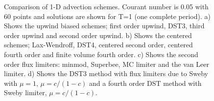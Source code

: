 \begin{figure}
\caption{
Comparison of 1-D advection schemes. Courant number is 0.05 with 60
points and solutions are shown for T=1 (one complete period).
a) Shows the upwind biased schemes; first order upwind, DST3,
third order upwind and second order upwind.
b) Shows the centered schemes; Lax-Wendroff, DST4, centered second order,
centered fourth order and finite volume fourth order.
c) Shows the second order flux limiters: minmod, Superbee,
MC limiter and the van Leer limiter.
d) Shows the DST3 method with flux limiters due to Sweby with
$\mu=1$, $\mu=c/(1-c)$ and a fourth order DST method with Sweby limiter,
$\mu=c/(1-c)$.
\label{fig:advect-1d-lo}
}
\end{figure}

